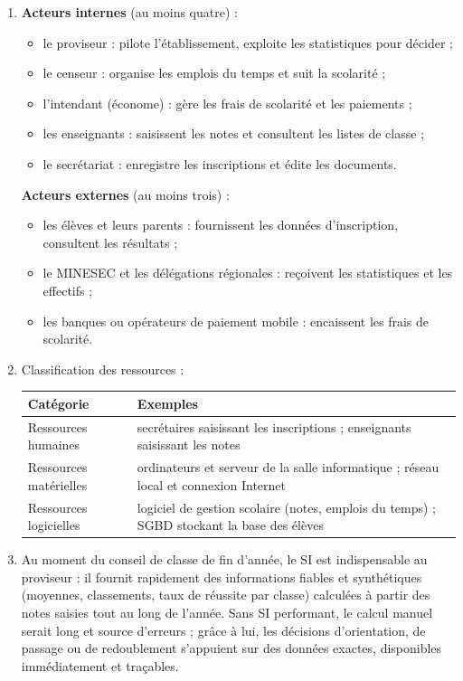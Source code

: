\documentclass[11pt]{article}
\newcommand{\cle}[1]{{\popxbold\color{popdark}#1}}
\begin{document}
\begin{corrige}
\begin{enumerate}
    \item \textbf{Acteurs internes} (au moins quatre) :
    \begin{itemize}
        \item le \cle{proviseur} : pilote l'établissement, exploite les statistiques pour décider ;
        \item le \cle{censeur} : organise les emplois du temps et suit la scolarité ;
        \item l'\cle{intendant} (économe) : gère les frais de scolarité et les paiements ;
        \item les \cle{enseignants} : saisissent les notes et consultent les listes de classe ;
        \item le \cle{secrétariat} : enregistre les inscriptions et édite les documents.
    \end{itemize}
    \textbf{Acteurs externes} (au moins trois) :
    \begin{itemize}
        \item les \cle{élèves} et leurs \cle{parents} : fournissent les données d'inscription, consultent les résultats ;
        \item le \cle{MINESEC} et les délégations régionales : reçoivent les statistiques et les effectifs ;
        \item les \cle{banques} ou opérateurs de paiement mobile : encaissent les frais de scolarité.
    \end{itemize}
    \item Classification des ressources :
\begin{center}
\begin{tabularx}{\linewidth}{|l|X|}
\hline
\rowcolor{popblueL} \textbf{Catégorie} & \textbf{Exemples} \\
\hline
Ressources humaines & secrétaires saisissant les inscriptions ; enseignants saisissant les notes \\
\hline
Ressources matérielles & ordinateurs et serveur de la salle informatique ; réseau local et connexion Internet \\
\hline
Ressources logicielles & logiciel de gestion scolaire (notes, emplois du temps) ; SGBD stockant la base des élèves \\
\hline
\end{tabularx}
\end{center}
    \item Au moment du conseil de classe de fin d'année, le SI est indispensable au proviseur : il fournit rapidement des informations fiables et synthétiques (moyennes, classements, taux de réussite par classe) calculées à partir des notes saisies tout au long de l'année. Sans SI performant, le calcul manuel serait long et source d'erreurs ; grâce à lui, les décisions d'orientation, de passage ou de redoublement s'appuient sur des données exactes, disponibles immédiatement et traçables.

\end{enumerate}
\end{corrige}
\end{document}

